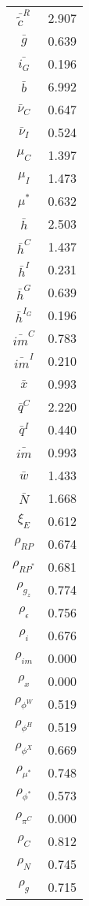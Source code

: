 \begin{center}
\begin{longtable}{cc}
$\bar{\tilde{c}}^R$ 	 & 	 2.907 \\
$\bar{g}$ 	 & 	 0.639 \\
$\bar{i_G}$ 	 & 	 0.196 \\
$\bar{b}$ 	 & 	 6.992 \\
$\bar{\nu}_C$ 	 & 	 0.647 \\
$\bar{\nu}_I$ 	 & 	 0.524 \\
$\mu_C$ 	 & 	 1.397 \\
$\mu_I$ 	 & 	 1.473 \\
$\mu^*$ 	 & 	 0.632 \\
$\bar{h}$ 	 & 	 2.503 \\
$\bar{h}^C$ 	 & 	 1.437 \\
$\bar{h}^I$ 	 & 	 0.231 \\
$\bar{h}^G$ 	 & 	 0.639 \\
$\bar{h}^{I_G}$ 	 & 	 0.196 \\
$\bar{im}^C$ 	 & 	 0.783 \\
$\bar{im}^I$ 	 & 	 0.210 \\
$\bar{x}$ 	 & 	 0.993 \\
$\bar{q}^C$ 	 & 	 2.220 \\
$\bar{q}^I$ 	 & 	 0.440 \\
$\bar{im}$ 	 & 	 0.993 \\
$\bar{w}$ 	 & 	 1.433 \\
$\bar{N}$ 	 & 	 1.668 \\
$\xi_E$ 	 & 	 0.612 \\
$\rho_{RP}$ 	 & 	 0.674 \\
$\rho_{RP^*}$ 	 & 	 0.681 \\
$\rho_{g_z}$ 	 & 	 0.774 \\
$\rho_{\epsilon}$ 	 & 	 0.756 \\
$\rho_{i}$ 	 & 	 0.676 \\
$\rho_{im}$ 	 & 	 0.000 \\
$\rho_{x}$ 	 & 	 0.000 \\
$\rho_{\phi^W}$ 	 & 	 0.519 \\
$\rho_{\phi^H}$ 	 & 	 0.519 \\
$\rho_{\phi^X}$ 	 & 	 0.669 \\
$\rho_{\mu^*}$ 	 & 	 0.748 \\
$\rho_{\phi^*}$ 	 & 	 0.573 \\
$\rho_{\pi^C}$ 	 & 	 0.000 \\
$\rho_{C}$ 	 & 	 0.812 \\
$\rho_{N}$ 	 & 	 0.745 \\
$\rho_{g}$ 	 & 	 0.715 \\

\end{longtable}
\end{center}
